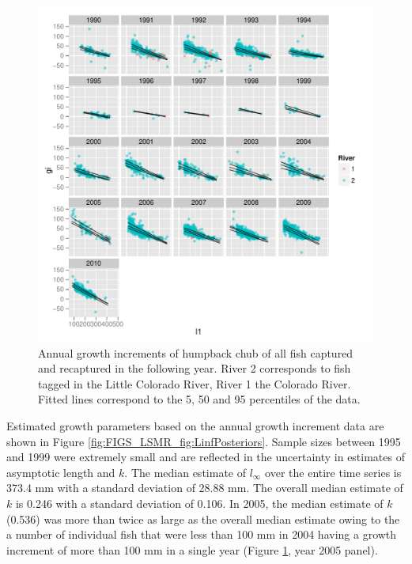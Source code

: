 \begin{figure}[htbp]
	\centering
		\includegraphics[width=6.5in]{../FIGS/LSMR/fig:AnnualGrowthIncrements.pdf}
	\caption{Annual growth increments of humpback chub of all fish captured and recaptured in the following year. River 2 corresponds to fish tagged in the Little Colorado River, River 1 the Colorado River. Fitted lines correspond to the 5, 50 and 95 percentiles of the data.}
	\label{fig:FIGS_LSMR_fig:AnnualGrowthIncrements}
\end{figure}

Estimated growth parameters based on the annual growth increment data are shown in Figure \ref{fig:FIGS_LSMR_fig:LinfPosteriors}.  Sample sizes between 1995 and 1999 were extremely small and are reflected in the uncertainty in estimates of asymptotic length and $k$.  The median estimate of $l_\infty$ over the entire time series is 373.4 mm with a standard deviation of 28.88 mm.  The overall median estimate of $k$ is 0.246 with a standard deviation of 0.106.  In 2005, the median estimate of $k$ (0.536) was more than twice as large as the overall median estimate owing to the a number of individual fish that were less than 100 mm in 2004 having a growth increment of more than 100 mm in a single year (Figure \ref{fig:FIGS_LSMR_fig:AnnualGrowthIncrements}, year 2005 panel).

